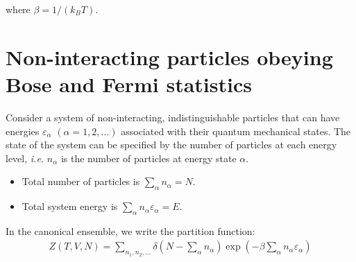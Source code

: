 \documentclass[book.tex]{subfiles}
\begin{document}
\noindent where $\beta = 1/(k_BT)$. %




\section{Non-interacting particles obeying Bose and Fermi statistics}

Consider a system of non-interacting, indistinguishable particles
that can have energies $\varepsilon_\alpha$ $(\alpha = 1,2,...)$ associated with their quantum mechanical states. The state of the system can be specified by the number of particles at each energy level, \textit{i.e.} $n_\alpha$ is the number of particles at energy state $\alpha$.

\begin{itemize}
\item Total number of particles is $\sum_\alpha n_\alpha=N$.
\item Total system energy is $\sum_\alpha n_\alpha \varepsilon_\alpha = E$.
\end{itemize}

In the canonical ensemble, we write the partition function:
\begin{align}\label{Eq1}
Z(T,V,N) = \sum_{n_1,n_2,...}\delta \left(N-\sum_\alpha n_\alpha\right) \exp \left(-\beta \sum_\alpha n_\alpha \varepsilon_\alpha\right)
\end{align}
\end{document}

